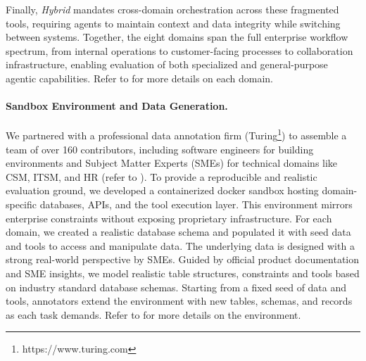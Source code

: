 Finally, \textit{Hybrid} mandates cross-domain orchestration across these fragmented tools, requiring agents to maintain context and data integrity while switching between systems. Together, the eight domains span the full enterprise workflow spectrum, from internal operations to customer-facing processes to collaboration infrastructure, enabling evaluation of both specialized and general-purpose agentic capabilities. Refer to  for more details on each domain.

\paragraph{Sandbox Environment and Data Generation.}
We partnered with a professional data annotation firm (Turing\footnote{https://www.turing.com}) to assemble a team of over 160 contributors, including software engineers for building environments and Subject Matter Experts (SMEs) for technical domains like CSM, ITSM, and HR (refer to ). To provide a reproducible and realistic evaluation ground, we developed a containerized docker sandbox hosting domain-specific databases, APIs, and the tool execution layer. This environment mirrors enterprise constraints without exposing proprietary infrastructure. For each domain, we created a realistic database schema and populated it with seed data and tools to access and manipulate data. The underlying data is designed with a strong real-world perspective by SMEs. Guided by official product documentation and SME insights, we model realistic table structures, constraints and tools based on industry standard database schemas. Starting from a fixed seed of data and tools, annotators extend the environment with new tables, schemas, and records as each task demands. Refer to  for more details on the environment. 


